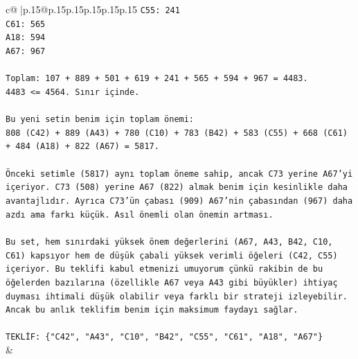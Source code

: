 \documentclass{article}
\begin{document}
{\begin{supertabular}{c@{$\;$}|p{.15\linewidth}@{}p{.15\linewidth}p{.15\linewidth}p{.15\linewidth}p{.15\linewidth}p{.15\linewidth}}
{{{\texttt{C55: 241} \\
\texttt{C61: 565} \\
\texttt{A18: 594} \\
\texttt{A67: 967} \\
\\ 
\texttt{Toplam: 107 + 889 + 501 + 619 + 241 + 565 + 594 + 967 = 4483.} \\
\texttt{4483 <= 4564. Sınır içinde.} \\
\\ 
\texttt{Bu yeni setin benim için toplam önemi:} \\
\texttt{808 (C42) + 889 (A43) + 780 (C10) + 783 (B42) + 583 (C55) + 668 (C61) + 484 (A18) + 822 (A67) = 5817.} \\
\\ 
\texttt{Önceki setimle (5817) aynı toplam öneme sahip, ancak C73 yerine A67'yi içeriyor. C73 (508) yerine A67 (822) almak benim için kesinlikle daha avantajlıdır. Ayrıca C73'ün çabası (909) A67'nin çabasından (967) daha azdı ama farkı küçük. Asıl önemli olan önemin artması.} \\
\\ 
\texttt{Bu set, hem sınırdaki yüksek önem değerlerini (A67, A43, B42, C10, C61) kapsıyor hem de düşük çabali yüksek verimli öğeleri (C42, C55) içeriyor. Bu teklifi kabul etmenizi umuyorum çünkü rakibin de bu öğelerden bazılarına (özellikle A67 veya A43 gibi büyükler) ihtiyaç duyması ihtimali düşük olabilir veya farklı bir strateji izleyebilir. Ancak bu anlık teklifim benim için maksimum faydayı sağlar.} \\
\\ 
\texttt{TEKLİF: \{"C42", "A43", "C10", "B42", "C55", "C61", "A18", "A67"\}} \\
            }
        }
    }
    & \\ \\


\end{supertabular}}
\end{document}
